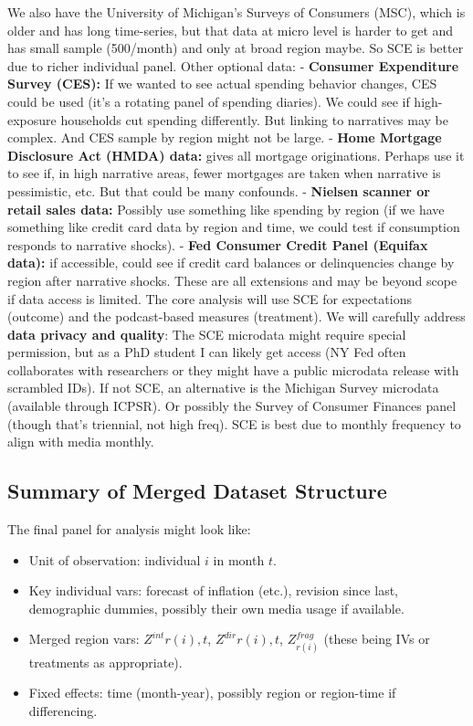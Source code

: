 \documentclass[12pt]{article}
\begin{document}
We also have the University of Michigan's Surveys of Consumers (MSC), which is older and has long time-series, but that data at micro level is harder to get and has small sample (500/month) and only at broad region maybe. So SCE is better due to richer individual panel.
Other optional data: - \textbf{Consumer Expenditure Survey (CES):} If we wanted to see actual spending behavior changes, CES could be used (it's a rotating panel of spending diaries). We could see if high-exposure households cut spending differently. But linking to narratives may be complex. And CES sample by region might not be large. - \textbf{Home Mortgage Disclosure Act (HMDA) data:} gives all mortgage originations. Perhaps use it to see if, in high narrative areas, fewer mortgages are taken when narrative is pessimistic, etc. But that could be many confounds. - \textbf{Nielsen scanner or retail sales data:} Possibly use something like spending by region (if we have something like credit card data by region and time, we could test if consumption responds to narrative shocks). - \textbf{Fed Consumer Credit Panel (Equifax data):} if accessible, could see if credit card balances or delinquencies change by region after narrative shocks.
These are all extensions and may be beyond scope if data access is limited. The core analysis will use SCE for expectations (outcome) and the podcast-based measures (treatment).
We will carefully address \textbf{data privacy and quality}: The SCE microdata might require special permission, but as a PhD student I can likely get access (NY Fed often collaborates with researchers or they might have a public microdata release with scrambled IDs). If not SCE, an alternative is the Michigan Survey microdata (available through ICPSR). Or possibly the Survey of Consumer Finances panel (though that's triennial, not high freq). SCE is best due to monthly frequency to align with media monthly.

\subsection{Summary of Merged Dataset Structure}
The final panel for analysis might look like:
\begin{itemize}
    \item Unit of observation: individual $i$ in month $t$.
    \item Key individual vars: forecast of inflation (etc.), revision since last, demographic dummies, possibly their own media usage if available.
    \item Merged region vars: $Z^{int}{r(i),t}$, $Z^{dir}{r(i),t}$, $Z^{frag}_{r(i)}$ (these being IVs or treatments as appropriate).
    \item Fixed effects: time (month-year), possibly region or region-time if differencing.
\end{itemize}
\end{document}
